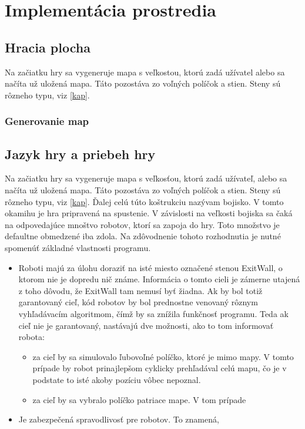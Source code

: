 \chapter{Implementácia prostredia}
\section{Hracia plocha} %
Na začiatku hry sa vygeneruje mapa s veľkostou, ktorú zadá užívatel alebo sa načíta už uložená mapa. Táto pozostáva zo voľných políčok a stien. Steny sú rôzneho typu, viz \ref{kap}. 
\subsection{Generovanie map}%
\section{Jazyk hry a priebeh hry} %
Na začiatku hry sa vygeneruje mapa s veľkosťou, ktorú zadá užívateľ, alebo sa načíta už uložená mapa. Táto pozostáva zo voľných políčok a stien. Steny sú rôzneho typu, viz \ref{kap}. Ďalej celú túto koštrukciu nazývam bojisko. V tomto okamihu je hra pripravená na spustenie. V závislosti na veľkosti bojiska sa čaká na odpovedajúce mnoštvo robotov, ktorí sa zapoja do hry. Toto množstvo je defaultne obmedzené iba zdola. Na zdôvodnenie tohoto rozhodnutia je nutné spomenúť základné vlastnosti programu. 
\begin{itemize}
\item Roboti majú za úlohu doraziť na isté miesto označené stenou ExitWall, o ktorom nie je dopredu nič známe. Informácia o tomto cieli je zámerne utajená z toho dôvodu, že ExitWall tam nemusí byť žiadna. Ak by bol totiž garantovaný cieľ, kód robotov by bol prednostne venovaný rôznym vyhľadávacím algoritmom, čímž by sa znížila funkčnosť programu. Teda ak cieľ nie je garantovaný, nastávajú dve možnosti, ako to tom informovať robota:\begin{itemize}
\item za cieľ by sa simulovalo ľubovoľné políčko, ktoré je mimo mapy. V tomto prípade by robot prinajlepšom cyklicky prehľadával celú mapu, čo je v podstate to isté akoby pozíciu vôbec nepoznal.
\item za cieľ by sa vybralo políčko patriace mape. V tom prípade 
\end{itemize}
\item Je zabezpečená spravodlivosť pre robotov. To znamená,
\end{itemize}

